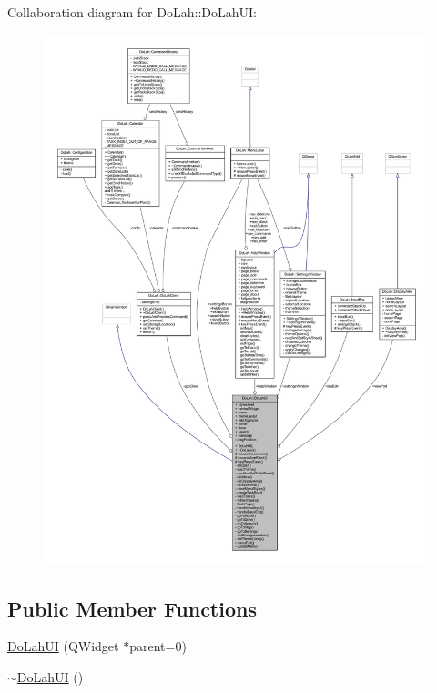 Collaboration diagram for Do\+Lah\+:\+:Do\+Lah\+U\+I\+:
\nopagebreak
\begin{figure}[H]
\begin{center}
\leavevmode
\includegraphics[width=350pt]{class_do_lah_1_1_do_lah_u_i__coll__graph}
\end{center}
\end{figure}
\subsection*{Public Member Functions}
\begin{DoxyCompactItemize}
\item 
\hyperlink{class_do_lah_1_1_do_lah_u_i_abebd16ed1bc81415d5eeba60e92ea6cc}{Do\+Lah\+U\+I} (Q\+Widget $\ast$parent=0)
\item 
\hyperlink{class_do_lah_1_1_do_lah_u_i_ac6d58b37556945d5358295726a029eb2}{$\sim$\+Do\+Lah\+U\+I} ()
\end{DoxyCompactItemize}
